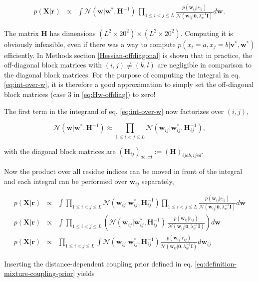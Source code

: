 \documentclass[12pt,a4paper,twoside]{book}
\newcommand{\eq}{\!=\!}
\newcommand{\Gauss}{\mathcal{N}}
\renewcommand{\H}{\mathbf{H}}
\newcommand{\I}{\mathbf{I}}
\renewcommand{\r}{\mathbf{r}}
\newcommand{\rij}{r_{ij}}
\renewcommand{\v}{\mathbf{v}}
\newcommand{\w}{\mathbf{w}}
\newcommand{\wij}{\mathbf{w}_{ij}}
\newcommand{\X}{\mathbf{X}}
\theoremstyle{definition}
\theoremstyle{definition}
\theoremstyle{remark}
\begin{document}
\begin{eqnarray}
      p(\X | \r) &\propto& \int \Gauss (\w | \w^*, \H^{-1} ) \, \prod_{1 \le i<j \le L} \frac{p(\wij | \rij)}{\Gauss(\wij|\mathbf{0}, \lambda_w^{-1} \I)} d\w \,.
\label{eq:int-over-w}
\end{eqnarray}

The matrix \(\H\) has dimensions
\((L^2 \times 20^2) \times (L^2 \times 20^2)\). Computing it is
obviously infeasible, even if there was a way to compute
\(p(x_i \eq a, x_j \eq b| \v^*,\w^*)\) efficiently. In Methods section
\ref{Hessian-offdiagonal} is shown that in practice, the off-diagonal
block matrices with \((i,j) \ne (k,l)\) are negligible in comparison to
the diagonal block matrices. For the purpose of computing the integral
in eq. \eqref{eq:int-over-w}, it is therefore a good approximation to
simply set the off-diagonal block matrices (case 3 in
\eqref{eq:Hw-offdiag}) to zero!

The first term in the integrand of eq. \eqref{eq:int-over-w} now
factorizes over \((i,j)\),

\begin{equation}
  \Gauss (\w | \w^{*}, \H^{-1}) \approx \prod_{1 \le i < j \le L} \Gauss (\wij | \wij^{*}, \H_{ij}^{-1}) ,
\end{equation}

with the diagonal block matrices are
\((\H_{ij})_{ab,cd} := (\H)_{ijab,ijcd}\).

Now the product over all residue indices can be moved in front of the
integral and each integral can be performed over \(\wij\) separately,

\begin{eqnarray}
  p(\X | \r) &\propto& \int \prod_{1 \le i < j \le L} \Gauss (\wij | \wij^{*}, \H_{ij}^{-1}) \prod_{1 \le i<j \le L} \frac{p(\wij | \rij)}{\Gauss(\wij|\mathbf{0}, \lambda_w^{-1} \I)} d\w  \\
  p(\X | \r) &\propto& \int \prod_{1\le i<j\le L} \left(  \Gauss (\wij | \wij^*, \H_{ij}^{-1}) \, \frac{p(\wij | \rij)}{\Gauss(\wij | \mathbf{0}, \lambda_w^{-1} \I)} \right) d\w \\
  p(\X | \r) &\propto& \prod_{1\le i<j\le L}  \int \Gauss (\wij | \wij^*, \H_{ij}^{-1}) \frac{p(\wij | \rij)}{\Gauss (\wij | \mathbf{0}, \lambda_w^{-1} \I)} d \wij 
\label{eq:int-over-w-2}
\end{eqnarray}

Inserting the distance-dependent coupling prior defined in eq.
\eqref{eq:definition-mixture-coupling-prior} yields
\end{document}

